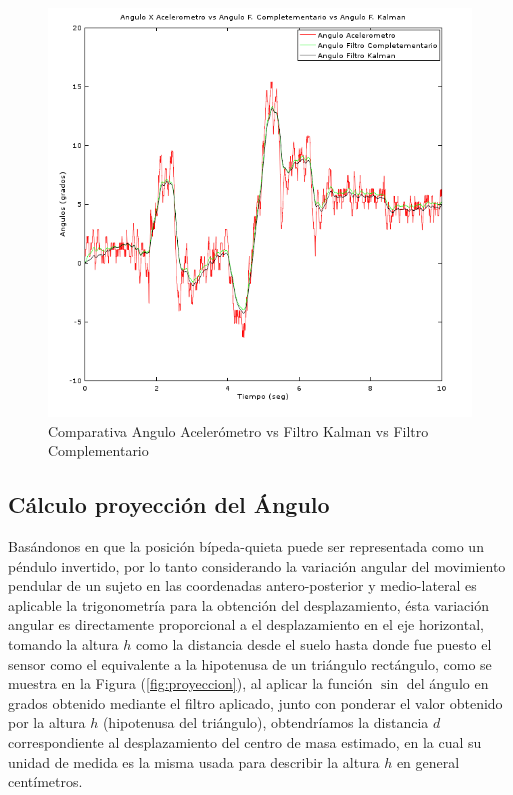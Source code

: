 \documentclass[12pt,a4paper]{article}
\begin{document}
			
			\begin{figure}[H]
				\centering
				\includegraphics[scale=0.7]{images/angKalCom}
				\caption{Comparativa Angulo Acelerómetro vs Filtro Kalman vs Filtro Complementario}
				\label{fig:AnguloXvsFiltros}
			\end{figure}
			
			\subsection{Cálculo proyección del Ángulo}
			Basándonos en que la posición bípeda-quieta puede ser representada como un péndulo invertido, por lo tanto considerando la variación angular del movimiento pendular de un sujeto en las coordenadas antero-posterior y medio-lateral es aplicable la trigonometría para la obtención del desplazamiento, ésta variación angular es directamente proporcional a el desplazamiento en el eje horizontal, tomando la altura $h$ como la distancia desde el suelo hasta donde fue puesto el sensor como el equivalente a la hipotenusa de un triángulo rectángulo, como se muestra en la Figura (\ref{fig:proyeccion}), al aplicar la función $\sin$ del ángulo en grados obtenido mediante el filtro aplicado, junto con ponderar el valor obtenido por la altura $h$ (hipotenusa del triángulo), obtendríamos la distancia $d$ correspondiente al desplazamiento del centro de masa estimado, en la cual su unidad de medida es la misma usada para describir la altura $h$ en general centímetros.
			
\end{document}
